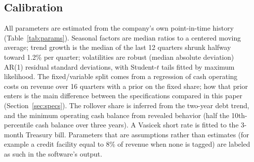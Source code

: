 \subsection{Calibration}
All parameters are estimated from the company's own point-in-time history (Table~\ref{tab:params}). Seasonal factors are median ratios to a centered moving average; trend growth is the median of the last 12 quarters shrunk halfway toward 1.2\% per quarter; volatilities are robust (median absolute deviation) AR(1) residual standard deviations, with Student-$t$ tails fitted by maximum likelihood. The fixed/variable split comes from a regression of cash operating costs on revenue over 16 quarters with a prior on the fixed share; how that prior enters is the main difference between the specifications compared in this paper (Section~\ref{sec:specs}). The rollover share is inferred from the two-year debt trend, and the minimum operating cash balance from revealed behavior (half the 10th-percentile cash balance over three years). A Vasicek short rate \citep{vasicek1977} is fitted to the 3-month Treasury bill. Parameters that are assumptions rather than estimates (for example a credit facility equal to 8\% of revenue when none is tagged) are labeled as such in the software's output.

